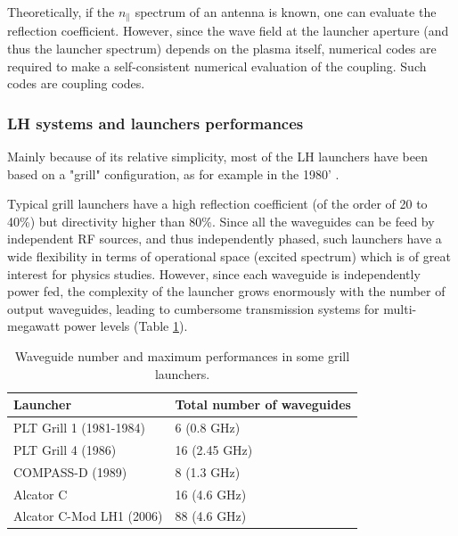 {Theoretically, if the $n_{\parallel}$ spectrum of an antenna is known, one can evaluate the reflection coefficient. However, since the wave field at the launcher aperture (and thus the launcher spectrum) depends on the plasma itself, numerical codes are required to make a self-consistent numerical evaluation of the coupling. Such codes are coupling codes.

\subsubsection{LH systems and launchers performances}
Mainly because of its relative simplicity, most of the LH launchers have been based on a "grill" configuration, as for example in the 1980' .

Typical grill launchers have a high reflection coefficient (of the order of 20 to 40\%) but directivity higher than 80\%. Since all the waveguides can be feed by independent RF sources, and thus independently phased, such launchers have a wide flexibility in terms of operational space (excited spectrum) which is of great interest for physics studies. However, since each waveguide is independently power fed, the complexity of the launcher grows enormously with the number of output waveguides, leading to cumbersome transmission systems for multi-megawatt power levels (Table \ref{tab:grillperformances}). 

\begin{table}
	{
		\begin{tabular}{| p{6cm} | p{5cm} |}
			\hline 
			Launcher & Total number of waveguides \\
			\hline \hline
			PLT Grill 1 (1981-1984)  \sidecite{stevens1988} & 6 (0.8 GHz) \\
			\hline
			PLT Grill 4 (1986) \sidecite{stevens1988} & 16 (2.45 GHz) \\
			\hline
			COMPASS-D (1989) & 8 (1.3 GHz) \\
			\hline
			Alcator C \sidecite{porkolab1984} & 16 (4.6 GHz) \\
			\hline
			Alcator C-Mod LH1 (2006) & 88 (4.6 GHz) \\
			\hline
		\end{tabular}
	}
	\caption{Waveguide number and maximum performances in some grill launchers.}
	\label{tab:grillperformances}
\end{table}

}
